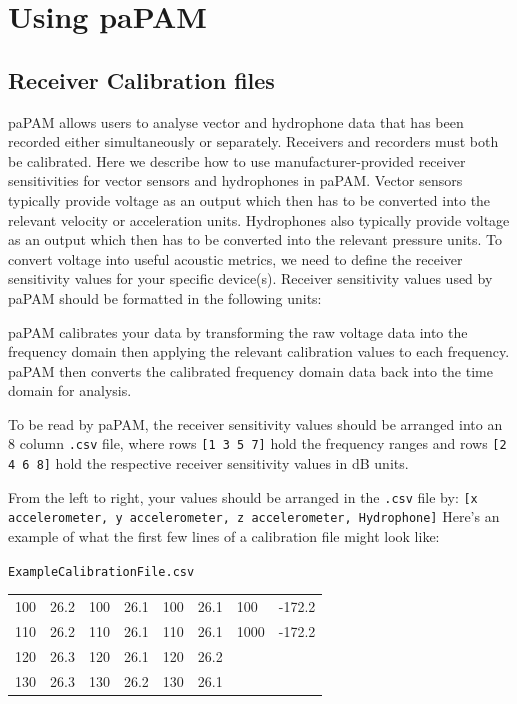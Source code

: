 \documentclass[11pt]{report}
\begin{document}
\chapter{Using paPAM}

\section{Receiver Calibration files}\label{CalibrationFiles}

paPAM allows users to analyse vector and hydrophone data that has been recorded either simultaneously or separately.
Receivers and recorders must both be calibrated.
Here we describe how to use manufacturer-provided receiver sensitivities for vector sensors and hydrophones in paPAM.
Vector sensors typically provide voltage as an output which then has to be converted into the relevant velocity or acceleration units.
Hydrophones also typically provide voltage as an output which then has to be converted into the relevant pressure units.
To convert voltage into useful acoustic metrics, we need to define the receiver sensitivity values for your specific device(s).
Receiver sensitivity values used by paPAM should be formatted in the following units:

\begin{enumerate}
	\item Pressure: \textit{dB (re 1 V/\SIUnitSymbolMicro Pa})}
	\item Velocity: \textit{dB (re 1 V/(m/s))}
\end{enumerate}

paPAM calibrates your data by transforming the raw voltage data into the frequency domain then applying the relevant calibration values to each frequency.  paPAM then converts the calibrated frequency domain data back into the time domain for analysis.

To be read by paPAM, the receiver sensitivity values should be arranged into an 8 column \texttt{.csv} file, where rows \texttt{[1 3 5 7]} hold the frequency ranges and rows \texttt{[2 4 6 8]} hold the respective receiver sensitivity values in dB units.

\begin{samepage}

 From the left to right, your values should be arranged in the \texttt{.csv} file by: \texttt{[x accelerometer, y accelerometer, z accelerometer, Hydrophone]}
Here's an example of what the first few lines of a calibration file might look like:

\texttt{ExampleCalibrationFile.csv}\\
\begin{tabular}{l l l l l l l l}
\hline
100 & 26.2 & 100 & 26.1 & 100 & 26.1 & 100 & -172.2 \\
110 & 26.2 & 110 & 26.1 & 110 & 26.1 & 1000 & -172.2 \\
120 & 26.3 & 120 & 26.1 & 120 & 26.2\\
130 & 26.3 & 130 & 26.2 & 130 & 26.1\\
\hline
\end{tabular}
\end{samepage}\\
\end{document}
